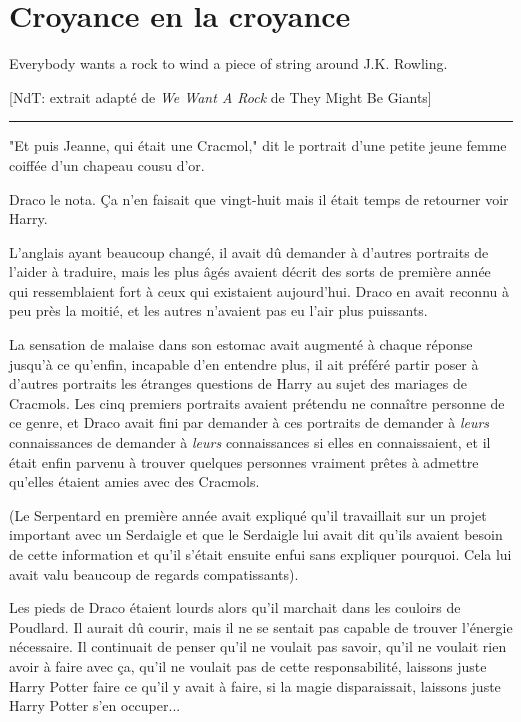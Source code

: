 
\chapter{Croyance en la croyance}

Everybody wants a rock to wind a piece of string around J.K. Rowling.

[NdT: extrait adapté de \emph{We Want A Rock}  de They Might Be Giants]
\par\noindent\rule{\textwidth}{0.4pt}
"Et puis Jeanne, qui était une Cracmol," dit le portrait d'une petite jeune femme coiffée d'un chapeau cousu d'or.

Draco le nota. Ça n'en faisait que vingt-huit mais il était temps de retourner voir Harry.

L'anglais ayant beaucoup changé, il avait dû demander à d'autres portraits de l'aider à traduire, mais les plus âgés avaient décrit des sorts de première année qui ressemblaient fort à ceux qui existaient aujourd'hui. Draco en avait reconnu à peu près la moitié, et les autres n'avaient pas eu l'air plus puissants.

La sensation de malaise dans son estomac avait augmenté à chaque réponse jusqu'à ce qu'enfin, incapable d'en entendre plus, il ait préféré partir poser à d'autres portraits les étranges questions de Harry au sujet des mariages de Cracmols. Les cinq premiers portraits avaient prétendu ne connaître personne de ce genre, et Draco avait fini par demander à ces portraits de demander à \emph{leurs}  connaissances de demander à \emph{leurs}  connaissances si elles en connaissaient, et il était enfin parvenu à trouver quelques personnes vraiment prêtes à admettre qu'elles étaient amies avec des Cracmols.

(Le Serpentard en première année avait expliqué qu'il travaillait sur un projet important avec un Serdaigle et que le Serdaigle lui avait dit qu'ils avaient besoin de cette information et qu'il s'était ensuite enfui sans expliquer pourquoi. Cela lui avait valu beaucoup de regards compatissants).

Les pieds de Draco étaient lourds alors qu'il marchait dans les couloirs de Poudlard. Il aurait dû courir, mais il ne se sentait pas capable de trouver l'énergie nécessaire. Il continuait de penser qu'il ne voulait pas savoir, qu'il ne voulait rien avoir à faire avec ça, qu'il ne voulait pas de cette responsabilité, laissons juste Harry Potter faire ce qu'il y avait à faire, si la magie disparaissait, laissons juste Harry Potter s'en occuper...

